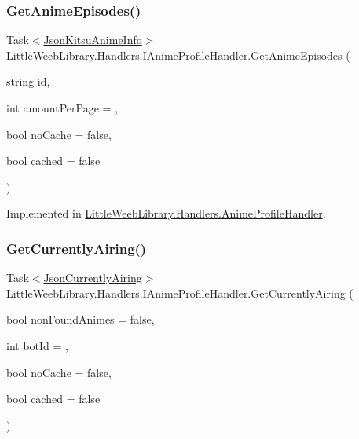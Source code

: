 \subsubsection{\texorpdfstring{Get\+Anime\+Episodes()}{GetAnimeEpisodes()}}
{\footnotesize\ttfamily Task$<$\mbox{\hyperlink{class_little_weeb_library_1_1_models_1_1_json_kitsu_anime_info}{Json\+Kitsu\+Anime\+Info}}$>$ Little\+Weeb\+Library.\+Handlers.\+I\+Anime\+Profile\+Handler.\+Get\+Anime\+Episodes (\begin{DoxyParamCaption}\item[{string}]{id,  }\item[{int}]{amount\+Per\+Page = {},  }\item[{bool}]{no\+Cache = {\ttfamily false},  }\item[{bool}]{cached = {\ttfamily false} }\end{DoxyParamCaption})}



Implemented in \mbox{\hyperlink{class_little_weeb_library_1_1_handlers_1_1_anime_profile_handler_a5b163eb7e68b1e40904fa55454d8ba54}{Little\+Weeb\+Library.\+Handlers.\+Anime\+Profile\+Handler}}.

\mbox{\label{interface_little_weeb_library_1_1_handlers_1_1_i_anime_profile_handler_ad59273ddfe35a2560f3e07879b334c25}} 
\subsubsection{\texorpdfstring{Get\+Currently\+Airing()}{GetCurrentlyAiring()}}
{\footnotesize\ttfamily Task$<$\mbox{\hyperlink{class_little_weeb_library_1_1_models_1_1_json_currently_airing}{Json\+Currently\+Airing}}$>$ Little\+Weeb\+Library.\+Handlers.\+I\+Anime\+Profile\+Handler.\+Get\+Currently\+Airing (\begin{DoxyParamCaption}\item[{bool}]{non\+Found\+Animes = {\ttfamily false},  }\item[{int}]{bot\+Id = {},  }\item[{bool}]{no\+Cache = {\ttfamily false},  }\item[{bool}]{cached = {\ttfamily false} }\end{DoxyParamCaption})}



